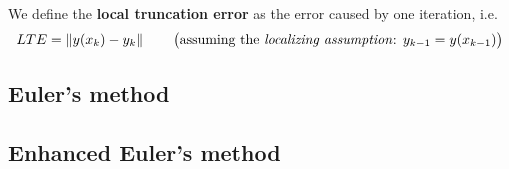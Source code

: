 \begin{definition}
  We define the \textbf{local truncation error} as the error caused by one iteration, i.e. $$LTE = \left\lVert y(x_k) - y_k\right\rVert \qquad \text{\big(assuming the \textit{localizing assumption}: $y_{k-1} = y(x_{k-1})$\big)}$$
\end{definition}

\subsection{Euler's method}

\newpage

\subsection{Enhanced Euler's method}

